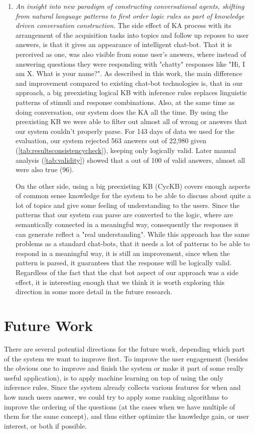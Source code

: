 \begin{enumerate}
	\item \emph{An insight into new paradigm of constructing conversational agents,	shifting from natural language patterns to first order logic rules as part of knowledge driven conversation construction.} 
	The side effect of KA process with its arrangement of the acquisition tasks into topics and follow up reposes to user answers, is that it gives an appearance of  intelligent	chat-bot. That it is perceived as one, was also visible from some user's answers, where instead of answering questions they were responding with "chatty" responses like "Hi, I am X. What is your name?".
	As described in this work, the main difference and improvement compared to existing chat-bot technologies is, that in our approach, a big preexisting logical KB with	inference rules replaces linguistic patterns of stimuli and response combinations. Also, at the same time as doing conversation, 
	our system does the KA all the time. By using the preexisting KB we were able to	filter out almost all of wrong
	or answers that our system couldn't properly parse. For 143 days
	of data we used for the evaluation, our system rejected 563 answers out of 22,980 given (\autoref{tab:resultsconsistencycheck}), keeping only logically valid. Later manual analysis (\autoref{tab:validity}) showed that a out of 100 of valid answers, almost all were also true (96).
	
	On the other side, using	a big preexisting KB (CycKB) covers enough aspects of common sense knowledge for the system to be able to discuss about quite a lot of topics and give some feeling of understanding to the users. Since the patterns that our system
	can parse are converted to the logic, where are semantically connected 
	in a meaningful way, consequently the responses it can generate reflect a "real understanding". While this approach has the same problems as a standard chat-bots, that it needs a lot of patterns to be able to respond
	in a meaningful way, it is still an improvement, since when the pattern is
	parsed, it guarantees that the response will be logically valid. Regardless of the fact that the chat bot aspect of our approach was a side effect, it
	is interesting enough that we think it is worth exploring this direction in some more detail in the future research. 
\end{enumerate}

\section{Future Work}
There are several potential directions for the future work, depending which 
part of the system we want to improve first. 
To improve the user engagement (besides the obvious one to improve and finish
the system or make it part of some really useful application), is to apply
machine learning on top of using the only inference rules. Since the system
already collects various features for when and how much users answer, we could
try to apply some ranking algorithms to improve the ordering of the questions 
(at the cases when we have multiple of them for the same concept), and thus
either optimize the knowledge gain, or user interest, or both if possible.

